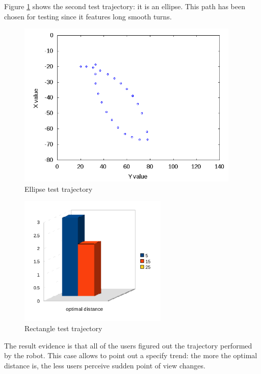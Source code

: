 Figure \ref{fig:ellipsetest} shows the second test trajectory:
it is an ellipse. This path has been chosen for testing since it
features long smooth turns.

\begin{figure}[!h]
  \begin{center}
    \includegraphics[width=300pt]{img/path_session_5.png}
    \caption{Ellipse test trajectory}
    \label{fig:ellipsetest}
  \end{center}
\end{figure}
%
\begin{figure}[!h]
  \begin{center}
    \includegraphics[width=200pt]{img/ellipse.png}
    \caption{Rectangle test trajectory}
  \end{center}
\end{figure}


The result evidence is that all of the users figured out the
trajectory performed by the robot. This case allows to point out
a specify trend: the more the optimal distance is, the less users
perceive sudden point of view changes.
%


